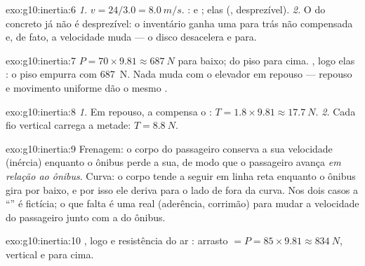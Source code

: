 \begin{solution}{exo:g10:inertia:6}
\emph{1.} $v = 24/3.0 = \qty{8.0}{m/s}$. :  e ;
elas  (,  desprezível).
\emph{2.} O  do concreto já não é desprezível: o inventário ganha
uma  para trás não compensada e, de fato, a velocidade muda --- o
disco desacelera e para.
\end{solution}

\begin{solution}{exo:g10:inertia:7}
 $P = 70 \times 9.81 \approx \qty{687}{N}$ para baixo;  do piso
para cima. , logo elas : o piso
empurra com \qty{687}{N}. Nada muda com o elevador em repouso --- repouso
e movimento uniforme dão o mesmo .
\end{solution}

\begin{solution}{exo:g10:inertia:8}
\emph{1.} Em repouso, a  compensa o :
$T = 1.8 \times 9.81 \approx \qty{17.7}{N}$. \emph{2.} Cada fio vertical
carrega a metade: $T = \qty{8.8}{N}$.
\end{solution}

\begin{solution}{exo:g10:inertia:9}
Frenagem: o corpo do passageiro conserva a sua velocidade (inércia)
enquanto o ônibus perde a sua, de modo que o passageiro avança \emph{em
relação ao ônibus}. Curva: o corpo tende a seguir em linha reta enquanto
o ônibus gira por baixo, e por isso ele deriva para o lado de fora da
curva. Nos dois casos a ``'' é fictícia; o que falta é uma 
real (aderência, corrimão) para mudar a velocidade do passageiro junto
com a do ônibus.
\end{solution}

\begin{solution}{exo:g10:inertia:10}
, logo  e resistência do ar :
arrasto $= P = 85 \times 9.81 \approx \qty{834}{N}$, vertical e para
cima.
\end{solution}


